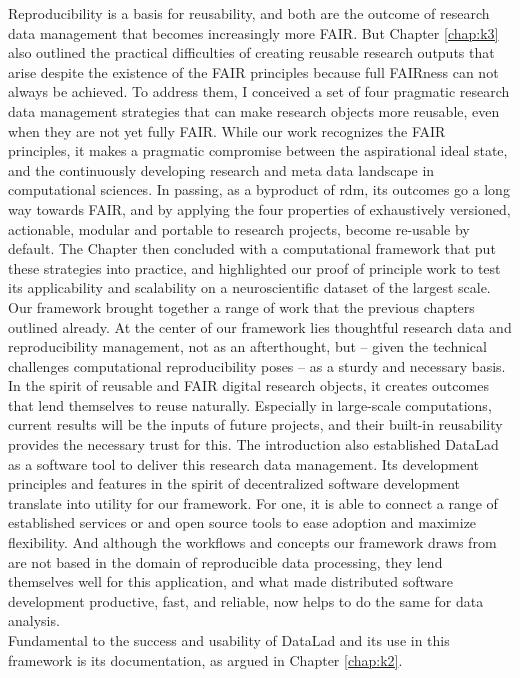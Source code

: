 Reproducibility is a basis for reusability, and both are the outcome of research data management that becomes increasingly more FAIR.
But Chapter \ref{chap:k3} also outlined the practical difficulties of creating reusable research outputs that arise despite the existence of the \gls{FAIR} principles because full FAIRness can not always be achieved.
To address them, I conceived a set of four pragmatic research data management strategies that can make research objects more reusable, even when they are not yet fully \gls{FAIR}.
While our work recognizes the FAIR principles, it makes a pragmatic compromise between the aspirational ideal state, and the continuously developing research and meta data landscape in computational sciences.
In passing, as a byproduct of \gls{rdm}, its outcomes go a long way towards FAIR, and by applying the four properties of exhaustively versioned, actionable, modular and portable to research projects, become re-usable by default.
The Chapter then concluded with a computational framework that put these strategies into practice, and highlighted our proof of principle work to test its applicability and scalability on a neuroscientific dataset of the largest scale.\\
Our framework brought together a range of work that the previous chapters outlined already.
At the center of our framework lies thoughtful research data and reproducibility management, not as an afterthought, but -- given the technical challenges computational reproducibility poses -- as a sturdy and necessary basis.
In the spirit of reusable and FAIR digital research objects, it creates outcomes that lend themselves to reuse naturally.
Especially in large-scale computations, current results will be the inputs of future projects, and their built-in reusability provides the necessary trust for this.
The introduction also established DataLad as a software tool to deliver this research data management.
Its development principles and features in the spirit of decentralized software development translate into utility for our framework.
For one, it is able to connect a range of established services or and open source tools to ease adoption and maximize flexibility.
And although the workflows and concepts our framework draws from are not based in the domain of reproducible data processing, they lend themselves well for this application, and what made distributed software development productive, fast, and reliable, now helps to do the same for data analysis.\\
Fundamental to the success and usability of DataLad and its use in this framework is its documentation, as argued in Chapter \ref{chap:k2}.
